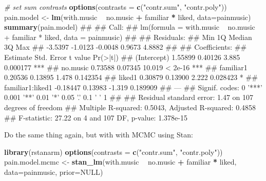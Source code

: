 \documentclass[]{article}
\newenvironment{Shaded}{\begin{snugshade}}{\end{snugshade}}
\newcommand{\KeywordTok}[1]{\textcolor[rgb]{0.13,0.29,0.53}{\textbf{#1}}}
\newcommand{\DataTypeTok}[1]{\textcolor[rgb]{0.13,0.29,0.53}{#1}}
\newcommand{\StringTok}[1]{\textcolor[rgb]{0.31,0.60,0.02}{#1}}
\newcommand{\CommentTok}[1]{\textcolor[rgb]{0.56,0.35,0.01}{\textit{#1}}}
\newcommand{\OtherTok}[1]{\textcolor[rgb]{0.56,0.35,0.01}{#1}}
\newcommand{\OperatorTok}[1]{\textcolor[rgb]{0.81,0.36,0.00}{\textbf{#1}}}
\newcommand{\NormalTok}[1]{#1}
\theoremstyle{definition}
\theoremstyle{definition}
\theoremstyle{definition}
\theoremstyle{remark}
\begin{document}
\begin{Shaded}
\begin{Highlighting}[]
\CommentTok{# set sum contrasts}
\KeywordTok{options}\NormalTok{(}\DataTypeTok{contrasts =} \KeywordTok{c}\NormalTok{(}\StringTok{"contr.sum"}\NormalTok{, }\StringTok{"contr.poly"}\NormalTok{))}
\NormalTok{pain.model <-}\StringTok{ }\KeywordTok{lm}\NormalTok{(with.music }\OperatorTok{~}\StringTok{ }
\StringTok{                   }\NormalTok{no.music }\OperatorTok{+}\StringTok{ }\NormalTok{familiar }\OperatorTok{*}\StringTok{ }\NormalTok{liked, }
                 \DataTypeTok{data=}\NormalTok{painmusic)}
\KeywordTok{summary}\NormalTok{(pain.model)}
\NormalTok{## }
\NormalTok{## Call:}
\NormalTok{## lm(formula = with.music ~ no.music + familiar * liked, data = painmusic)}
\NormalTok{## }
\NormalTok{## Residuals:}
\NormalTok{##     Min      1Q  Median      3Q     Max }
\NormalTok{## -3.5397 -1.0123 -0.0048  0.9673  4.8882 }
\NormalTok{## }
\NormalTok{## Coefficients:}
\NormalTok{##                  Estimate Std. Error t value Pr(>|t|)    }
\NormalTok{## (Intercept)       1.55899    0.40126   3.885 0.000177 ***}
\NormalTok{## no.music          0.73588    0.07345  10.019  < 2e-16 ***}
\NormalTok{## familiar1         0.20536    0.13895   1.478 0.142354    }
\NormalTok{## liked1            0.30879    0.13900   2.222 0.028423 *  }
\NormalTok{## familiar1:liked1 -0.18447    0.13983  -1.319 0.189909    }
\NormalTok{## ---}
\NormalTok{## Signif. codes:  0 '***' 0.001 '**' 0.01 '*' 0.05 '.' 0.1 ' ' 1}
\NormalTok{## }
\NormalTok{## Residual standard error: 1.47 on 107 degrees of freedom}
\NormalTok{## Multiple R-squared:  0.5043, Adjusted R-squared:  0.4858 }
\NormalTok{## F-statistic: 27.22 on 4 and 107 DF,  p-value: 1.378e-15}
\end{Highlighting}
\end{Shaded}

Do the same thing again, but with with MCMC using Stan:

\begin{Shaded}
\begin{Highlighting}[]
\KeywordTok{library}\NormalTok{(rstanarm)}
\KeywordTok{options}\NormalTok{(}\DataTypeTok{contrasts =} \KeywordTok{c}\NormalTok{(}\StringTok{"contr.sum"}\NormalTok{, }\StringTok{"contr.poly"}\NormalTok{))}
\NormalTok{pain.model.mcmc <-}\StringTok{ }\KeywordTok{stan_lm}\NormalTok{(with.music }\OperatorTok{~}\StringTok{ }\NormalTok{no.music }\OperatorTok{+}\StringTok{ }\NormalTok{familiar }\OperatorTok{*}\StringTok{ }\NormalTok{liked,}
                          \DataTypeTok{data=}\NormalTok{painmusic, }\DataTypeTok{prior=}\OtherTok{NULL}\NormalTok{)}
\end{Highlighting}
\end{Shaded}
\end{document}
